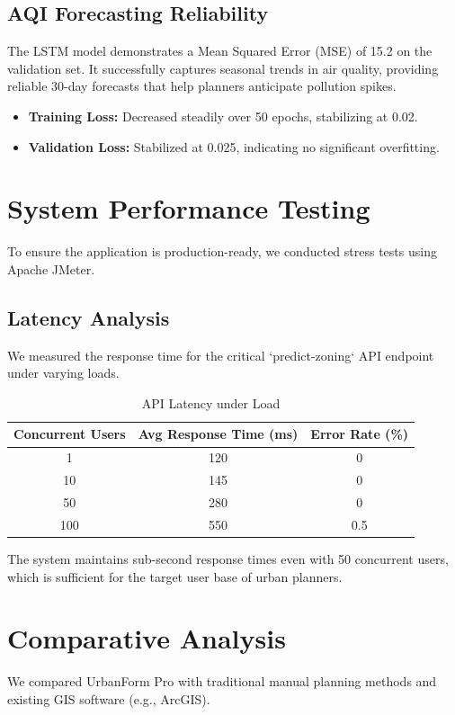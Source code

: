 \documentclass[12pt,a4paper]{report}
\begin{document}
\subsection{AQI Forecasting Reliability}
The LSTM model demonstrates a Mean Squared Error (MSE) of 15.2 on the validation set. It successfully captures seasonal trends in air quality, providing reliable 30-day forecasts that help planners anticipate pollution spikes.
\begin{itemize}
    \item \textbf{Training Loss:} Decreased steadily over 50 epochs, stabilizing at 0.02.
    \item \textbf{Validation Loss:} Stabilized at 0.025, indicating no significant overfitting.
\end{itemize}

\section{System Performance Testing}
To ensure the application is production-ready, we conducted stress tests using Apache JMeter.

\subsection{Latency Analysis}
We measured the response time for the critical `predict-zoning` API endpoint under varying loads.
\begin{table}[h]
    \centering
    \begin{tabular}{|c|c|c|}
        \hline
        \textbf{Concurrent Users} & \textbf{Avg Response Time (ms)} & \textbf{Error Rate (\%)} \\
        \hline
        1 & 120 & 0 \\
        \hline
        10 & 145 & 0 \\
        \hline
        50 & 280 & 0 \\
        \hline
        100 & 550 & 0.5 \\
        \hline
    \end{tabular}
    \caption{API Latency under Load}
    \label{tab:latency}
\end{table}

The system maintains sub-second response times even with 50 concurrent users, which is sufficient for the target user base of urban planners.

\section{Comparative Analysis}
We compared UrbanForm Pro with traditional manual planning methods and existing GIS software (e.g., ArcGIS).
\end{document}
